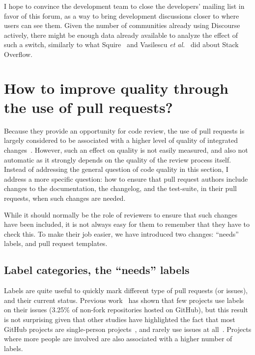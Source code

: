 I hope to convince the development team to close the developers' mailing list in favor of this forum, as a way to bring development discussions closer to where users can see them.
Given the number of communities already using Discourse actively, there might be enough data already available to analyze the effect of such a switch, similarly to what Squire~\cite{squire2015should} and Vasilescu \emph{et al.}~\cite{vasilescu2014social} did about Stack Overflow.

\section{How to improve quality through the use of pull requests?}

\label{sec:quality}

Because they provide an opportunity for code review, the use of pull requests is largely considered to be associated with a higher level of quality of integrated changes~\cite{katilius2019quality}.
However, such an effect on quality is not easily measured, and also not automatic as it strongly depends on the quality of the review process itself.
Instead of addressing the general question of code quality in this section, I address a more specific question: how to ensure that pull request authors include changes to the documentation, the changelog, and the test-suite, in their pull requests, when such changes are needed.

While it should normally be the role of reviewers to ensure that such changes have been included, it is not always easy for them to remember that they have to check this.
To make their job easier, we have introduced two changes: ``needs'' labels, and pull request templates.

\subsection{Label categories, the ``needs'' labels}

\label{sec:labels}

Labels are quite useful to quickly mark different type of pull requests (or issues), and their current status.
Previous work~\cite{cabot2015exploring} has shown that few projects use labels on their issues (3.25\% of non-fork repositories hosted on GitHub), but this result is not surprising given that other studies have highlighted the fact that most GitHub projects are single-person projects~\cite{kalliamvakou2016depth}, and rarely use issues at all~\cite{bissyande2013got}. Projects where more people are involved are also associated with a higher number of labels.

